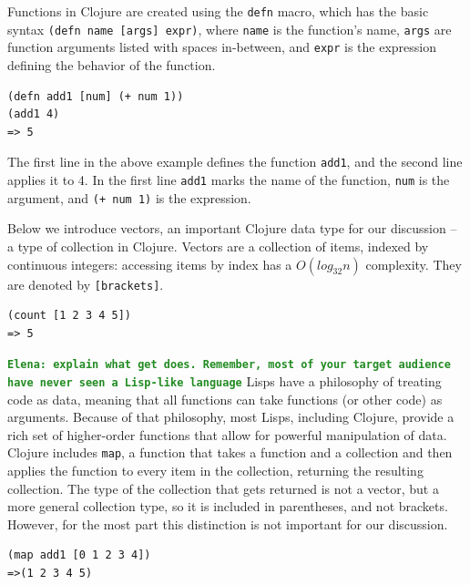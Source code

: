 \documentclass[12pt]{article}
\newcommand{\comment}[1]{{\bf \tt  {#1}}}
\newcommand{\emcomment}[1]{\textcolor{ForestGreen}{\comment{Elena: {#1}}}}
\newcommand{\hfcomment}[1]{\textcolor{Teal}{\comment{Henry: {#1}}}}
\newcommand{\clocode}[1]{{\texttt {#1}}}
\begin{document}
Functions in Clojure are created using the \clocode{defn} macro, which has the basic syntax \clocode{(defn name [args] expr)}, where \clocode{name} is the function's name, \clocode{args} are function arguments listed with spaces in-between, and \clocode{expr} is the expression defining the behavior of the function. 
\begin{verbatim}
(defn add1 [num] (+ num 1))
(add1 4)
=> 5
\end{verbatim} 
The first line in the above example defines the function \clocode{add1}, and the second line applies it to 4. In the first line \clocode{add1} marks the name of the function, \clocode{num} is the argument, and \clocode{(+ num 1)} is the expression.

Below we introduce vectors, an important Clojure data type for our discussion -- a type of collection in Clojure. Vectors are a collection of items, indexed by continuous integers: accessing items by index has a $O(log_{32}n)$  complexity. They are denoted by 
\clocode{[brackets]}.
\begin{verbatim}
(count [1 2 3 4 5])
=> 5
\end{verbatim}
\emcomment{explain what get does. Remember, most of your target audience have never seen a Lisp-like language}
Lisps have a philosophy of treating code as data, meaning that all functions can take functions (or other code) as arguments. Because of that philosophy, most Lisps, including Clojure, provide a rich set of higher-order functions that allow for powerful manipulation of data. Clojure includes \clocode{map}, a function that takes a function and a collection and then applies the function to every item in the collection, returning the resulting collection. The type of the collection that gets returned is not a vector, but a more general collection type, so it is included in parentheses, and not brackets. However, for the most part this distinction is not important for our discussion. 
\begin{verbatim}
(map add1 [0 1 2 3 4])
=>(1 2 3 4 5)
\end{verbatim}
\end{document}
